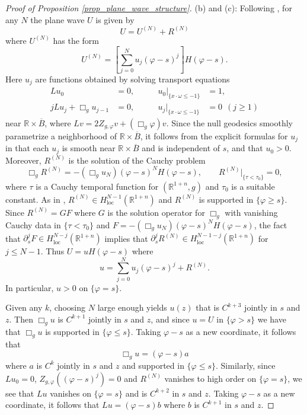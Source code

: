 \documentclass[11pt,letterpaper]{amsart}
\theoremstyle{definition}
\numberwithin{equation}{section}
\newcommand{\mR}{\mathbb{R}}                    %
\newcommand{\ol}[1]{\overline{#1}}
\newcommand{\p}{\partial}
\def\p{\partial}
\begin{document}
\begin{proof}[Proof of Proposition \ref{prop_plane_wave_structure}]
(b) and (c): Following \cite[proof of Lemma 5.3]{oksanen2024}, for any $N$ the plane wave $U$ is given by 
\[
U = U^{(N)} + R^{(N)}
\]
where $U^{(N)}$ has the form 
\[
U^{(N)} = \left[ \sum_{j=0}^N u_j(\varphi-s)^j \right] H(\varphi-s).
\]
Here $u_j$ are functions obtained by solving transport equations 
\begin{align*}
Lu_0 &= 0, \qquad &u_0|_{\{x\cdot \omega \leq -1\}} &= 1, \\
j L u_j + \Box_g u_{j-1} &= 0, \qquad &u_j|_{\{ x\cdot \omega \leq -1 \}} &= 0 \ \ (j \geq 1)
\end{align*}
near $\mR \times \ol{B}$, where $Lv = 2Z_{g,\varphi} v + (\Box_g \varphi)v$. Since the null geodesics smoothly parametrize a neighborhood of $\mR \times \ol{B}$, it follows from the explicit formulas for $u_j$ in \cite[proof of Lemma 5.3]{oksanen2024} that each $u_j$ is smooth near $\mR \times \ol{B}$ and is independent of $s$, and that $u_0 > 0$. Moreover, $R^{(N)}$ is the solution of the Cauchy problem 
\[
\Box_g R^{(N)} = -(\Box_g u_N) (\varphi-s)^N H(\varphi-s), \qquad R^{(N)}|_{\{ \tau < \tau_0 \}} = 0,
\]
where $\tau$ is a Cauchy temporal function for $(\mR^{1+n},g)$ and $\tau_0$ is a suitable constant. As in \cite[proof of Lemma 5.3]{oksanen2024}, $R^{(N)} \in H^{N-1}_{\mathrm{loc}}(\mR^{1+n})$ and $R^{(N)}$ is supported in $\{ \varphi \geq s \}$. Since $R^{(N)} = G F$ where $G$ is the solution operator for $\Box_g$ with vanishing Cauchy data in $\{ \tau < \tau_0 \}$ and $F = -(\Box_g u_N) (\varphi-s)^N H(\varphi-s)$, the fact that $\p_s^j F \in H^{N-j}_{\mathrm{loc}}(\mR^{1+n})$ implies that $\p_s^j R^{(N)} \in H^{N-1-j}_{\mathrm{loc}}(\mR^{1+n})$ for $j \leq N-1$. Thus $U = u H(\varphi-s)$ where 
\[
u = \sum_{j=0}^N u_j(\varphi-s)^j + R^{(N)}.
\]
In particular, $u > 0$ on $\{ \varphi = s \}$.

Given any $k$, choosing $N$ large enough yields $u(z)$ that is $C^{k+3}$ jointly in $s$ and $z$. Then $\Box_g u$ is $C^{k+1}$ jointly in $s$ and $z$, and since $u=U$ in $\{ \varphi > s \}$ we have that $\Box_g u$ is supported in $\{ \varphi \leq s \}$. Taking $\varphi-s$ as a new coordinate, it follows that 
\[
\Box_g u = (\varphi-s) a
\]
where $a$ is $C^k$ jointly in $s$ and $z$ and supported in $\{ \varphi \leq s \}$. Similarly, since $Lu_0 = 0$, $Z_{g,\varphi}((\varphi-s)^j) = 0$ and $R^{(N)}$ vanishes to high order on $\{ \varphi=s \}$, we see that $Lu$ vanishes on $\{ \varphi = s \}$ and is $C^{k+2}$ in $s$ and $z$. Taking $\varphi-s$ as a new coordinate, it follows that $Lu = (\varphi-s) b$ where $b$ is $C^{k+1}$ in $s$ and $z$.


\end{proof}
\end{document}
